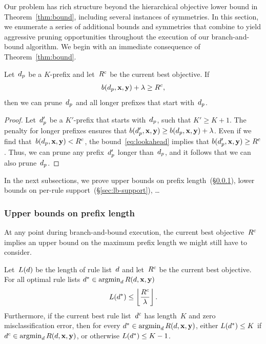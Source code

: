 Our problem has rich structure beyond the hierarchical objective lower bound
in Theorem~\ref{thm:bound}, including several instances of symmetries.
%
In this section, we enumerate a series of additional bounds and symmetries that
combine to yield aggressive pruning opportunities throughout the execution of
our branch-and-bound algorithm.
%
We begin with an immediate consequence of Theorem~\ref{thm:bound}.

\begin{theorem}
Let~$d_p$ be a $K$-prefix
and let~$R^c$ be the current best objective.
%
If
\begin{align}
 b(\Prefix, \x, \y) + \Reg \ge \CurrentObj,
\label{eq:lookahead}
\end{align}
then we can prune~$d_p$ and all longer prefixes that start with~$d_p$.
\end{theorem}

\begin{proof}
Let~$d_p'$ be a $K'$-prefix that starts with~$d_p$,
such that ${K' \ge K + 1}$.
%
The penalty for longer prefixes ensures that
${b(d_p', \mathbf{x}, \mathbf{y}) \ge b(d_p, \mathbf{x}, \mathbf{y}) + {\lambda}}$.
%
Even if we find that~${b(d_p, \mathbf{x}, \mathbf{y}) < R^c}$,
the bound~\eqref{eq:lookahead} implies that
${b(d_p', \mathbf{x}, \mathbf{y}) \ge R^c}$.
%
Thus, we can prune any prefix~$d_p'$ longer than~$d_p$,
and it follows that we can also prune~$d_p$.
\end{proof}

In the next subsections, we prove
upper bounds on prefix length~(\S\ref{sec:ub-prefix-length}),
lower bounds on per-rule support~(\S\ref{sec:lb-support}),
\dots

\subsubsection{Upper bounds on prefix length}
\label{sec:ub-prefix-length}

At any point during branch-and-bound execution, the current best objective~$R^c$
implies an upper bound on the maximum prefix length we might still have to consider.

\begin{theorem}
\label{thm:ub-prefix-length}
Let~$L({d})$ be the length of rule list~${d}$
and let~$R^c$ be the current best objective.
For all optimal rule lists ${d^* \in \operatorname*{argmin}_{d} R({d}, \mathbf{x}, \mathbf{y})}$
\begin{align}
L(\OptimalRL) \le \left\lfloor \frac{\CurrentObj}{\Reg} \right\rfloor.
\label{eq:max-length}
\end{align}
Furthermore, if the current best rule list~$d^c$
has length~$K$ and zero misclassification error,
then for every ${d^* \in \operatorname*{argmin}_{d} R({d}, \mathbf{x}, \mathbf{y})}$,
either ${L(d^*) \le K}$ if ${d^c \in \operatorname*{argmin}_d R({d}, \mathbf{x}, \mathbf{y})}$,
or otherwise ${L(d^*) \le K - 1}$.
\end{theorem}

